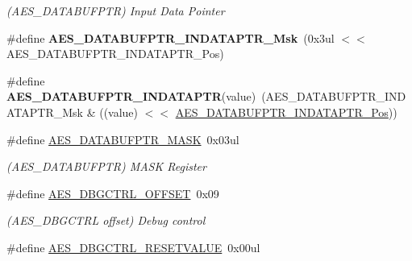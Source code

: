 \begin{DoxyCompactItemize}
\begin{DoxyCompactList}\small\item\em (A\+E\+S\+\_\+\+D\+A\+T\+A\+B\+U\+F\+P\+T\+R) Input Data Pointer \end{DoxyCompactList}\item 
\hypertarget{group___s_a_m_l21___a_e_s_ga9bd9be7126842692db96aec68f0e2569}{}\#define {\bfseries A\+E\+S\+\_\+\+D\+A\+T\+A\+B\+U\+F\+P\+T\+R\+\_\+\+I\+N\+D\+A\+T\+A\+P\+T\+R\+\_\+\+Msk}~(0x3ul $<$$<$ A\+E\+S\+\_\+\+D\+A\+T\+A\+B\+U\+F\+P\+T\+R\+\_\+\+I\+N\+D\+A\+T\+A\+P\+T\+R\+\_\+\+Pos)\label{group___s_a_m_l21___a_e_s_ga9bd9be7126842692db96aec68f0e2569}

\item 
\hypertarget{group___s_a_m_l21___a_e_s_gab2c19a926220999d0c753abd58c2b71d}{}\#define {\bfseries A\+E\+S\+\_\+\+D\+A\+T\+A\+B\+U\+F\+P\+T\+R\+\_\+\+I\+N\+D\+A\+T\+A\+P\+T\+R}(value)~(A\+E\+S\+\_\+\+D\+A\+T\+A\+B\+U\+F\+P\+T\+R\+\_\+\+I\+N\+D\+A\+T\+A\+P\+T\+R\+\_\+\+Msk \& ((value) $<$$<$ \hyperlink{group___s_a_m_l21___a_e_s_ga915d567de3a6921a7af37e419cbfb473}{A\+E\+S\+\_\+\+D\+A\+T\+A\+B\+U\+F\+P\+T\+R\+\_\+\+I\+N\+D\+A\+T\+A\+P\+T\+R\+\_\+\+Pos}))\label{group___s_a_m_l21___a_e_s_gab2c19a926220999d0c753abd58c2b71d}

\item 
\hypertarget{group___s_a_m_l21___a_e_s_ga976dbeb7c942e941c35c792b909beb45}{}\#define \hyperlink{group___s_a_m_l21___a_e_s_ga976dbeb7c942e941c35c792b909beb45}{A\+E\+S\+\_\+\+D\+A\+T\+A\+B\+U\+F\+P\+T\+R\+\_\+\+M\+A\+S\+K}~0x03ul\label{group___s_a_m_l21___a_e_s_ga976dbeb7c942e941c35c792b909beb45}

\begin{DoxyCompactList}\small\item\em (A\+E\+S\+\_\+\+D\+A\+T\+A\+B\+U\+F\+P\+T\+R) M\+A\+S\+K Register \end{DoxyCompactList}\item 
\hypertarget{group___s_a_m_l21___a_e_s_ga35726f74c47a7e351127014531da2f47}{}\#define \hyperlink{group___s_a_m_l21___a_e_s_ga35726f74c47a7e351127014531da2f47}{A\+E\+S\+\_\+\+D\+B\+G\+C\+T\+R\+L\+\_\+\+O\+F\+F\+S\+E\+T}~0x09\label{group___s_a_m_l21___a_e_s_ga35726f74c47a7e351127014531da2f47}

\begin{DoxyCompactList}\small\item\em (A\+E\+S\+\_\+\+D\+B\+G\+C\+T\+R\+L offset) Debug control \end{DoxyCompactList}\item 
\hypertarget{group___s_a_m_l21___a_e_s_ga365d4b4068e5939248cd6302b995a413}{}\#define \hyperlink{group___s_a_m_l21___a_e_s_ga365d4b4068e5939248cd6302b995a413}{A\+E\+S\+\_\+\+D\+B\+G\+C\+T\+R\+L\+\_\+\+R\+E\+S\+E\+T\+V\+A\+L\+U\+E}~0x00ul\label{group___s_a_m_l21___a_e_s_ga365d4b4068e5939248cd6302b995a413}


\end{DoxyCompactItemize}
